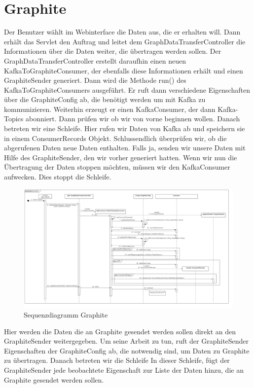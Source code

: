 \section{Graphite}
Der Benutzer wählt im Webinterface die Daten aus, die er erhalten will.
Dann erhält das Servlet den Auftrag und leitet dem GraphDataTransferController die Informationen über die Daten weiter, die übertragen werden sollen.
Der GraphDataTransferController erstellt daraufhin einen neuen KafkaToGraphiteConsumer, der ebenfalls diese Informationen erhält und einen GraphiteSender generiert.
Dann wird die Methode run() des KafkaToGraphiteConsumers ausgeführt.
Er ruft dann verschiedene Eigenschaften über die GraphiteConfig ab, die benötigt werden um mit Kafka zu kommunizieren.
Weiterhin erzeugt er einen KafkaConsumer, der dann Kafka-Topics abonniert.
Dann prüfen wir ob wir von vorne beginnen wollen.
Danach betreten wir eine Schleife. Hier rufen wir Daten von Kafka ab und speichern sie in einem ConsumerRecords Objekt.
Schlussendlich überprüfen wir, ob die abgerufenen Daten neue Daten enthalten.
Falls ja, senden wir unsere Daten mit Hilfe des GraphiteSender, den wir vorher generiert hatten.
Wenn wir nun die Übertragung der Daten stoppen möchten, müssen wir den KafkaConsumer aufwecken. Dies stoppt die Schleife.
\begin{figure}[!hbp]
	\centering
	\includegraphics[width=\linewidth]{images/graphite/graphiteMainSequenceDiagram_small.png}
	\caption{Sequenzdiagramm Graphite}
\end{figure}
\newpage
Hier werden die Daten die an Graphite gesendet werden sollen direkt an den GraphiteSender weitergegeben.
Um seine Arbeit zu tun, ruft der GraphiteSender Eigenschaften der GraphiteConfig ab, die notwendig sind, um Daten zu Graphite zu übertragen.
Danach betreten wir die Schleife
In dieser Schleife, fügt der GraphiteSender jede beobachtete Eigenschaft zur Liste der Daten hinzu, die an Graphite gesendet werden sollen.
